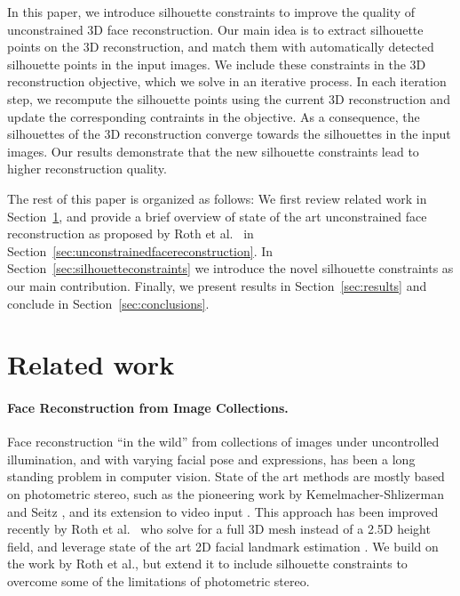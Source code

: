 In this paper, we introduce silhouette constraints to improve the quality of unconstrained 3D face reconstruction. Our main idea is to extract silhouette points on the 3D reconstruction, and match them with automatically detected silhouette points in the input images. We include these constraints in the 3D reconstruction objective, which we solve in an iterative process. In each iteration step, we recompute the silhouette points using the current 3D reconstruction and update the corresponding contraints in the objective. As a consequence, the silhouettes of the 3D reconstruction converge towards the silhouettes in the input images. Our results demonstrate that the new silhouette constraints lead to higher reconstruction quality.

The rest of this paper is organized as follows: We first review related work in Section~\ref{sec:related}, and provide a brief overview of state of the art unconstrained face reconstruction as proposed by Roth et al.~\cite{Roth:2015:UFR} in Section~\ref{sec:unconstrainedfacereconstruction}. In Section~\ref{sec:silhouetteconstraints} we introduce the novel silhouette constraints as our main contribution. Finally, we present results in Section~\ref{sec:results} and conclude in Section~\ref{sec:conclusions}.


\section{Related work}
\label{sec:related}

\paragraph*{Face Reconstruction from Image Collections.} Face reconstruction ``in the wild'' from collections of images under uncontrolled illumination, and with varying facial pose and expressions, has been a long standing problem in computer vision. State of the art methods are mostly based on photometric stereo, such as the pioneering work by Kemelmacher-Shlizerman and Seitz \cite{Kemelmacher-Shlizerman:2011:FRW}, and its extension to video input \cite{Suwajanakorn2014}. This approach has been improved recently by Roth et al.~\cite{Roth:2015:UFR} who solve for a full 3D mesh instead of a 2.5D height field, and leverage state of the art 2D facial landmark estimation \cite{Zan:2013:LCM}. We build on the work by Roth et al., but extend it to include silhouette constraints to overcome some of the limitations of photometric stereo.

